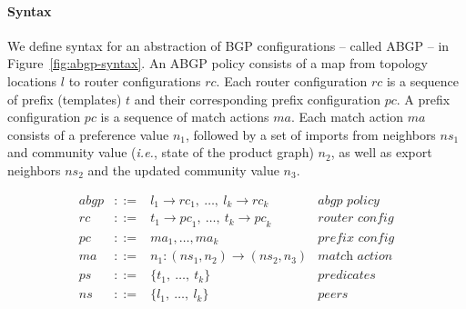 \documentclass[twocolumn, openany]{sig-alternate-10pt}
\newcommand{\IE}{\emph{i.e.}}
\newcommand{\para}[1]{\paragraph*{\textbf{#1}}}
\begin{document}
\para{Syntax}

We define syntax for an abstraction of BGP configurations -- called ABGP -- in Figure~\ref{fig:abgp-syntax}. An ABGP policy consists of a map from topology locations $l$ to router configurations $rc$. Each router configuration $rc$ is a sequence of prefix (templates) $t$ and their corresponding prefix configuration $pc$. A prefix configuration $pc$ is a sequence of match actions $ma$. Each match action $ma$ consists of a preference value $n_1$, followed by a set of imports from neighbors $ns_1$ and community value (\IE, state of the product graph) $n_2$, as well as export neighbors $ns_2$ and the updated community value $n_3$.

\vspace{2em}
\begin{figure}[h!]\small

  \hrulefill%
  \vspace{1em}

  \begin{minipage}[t]{.5\linewidth}
  \vspace*{-1\baselineskip}
  \[ \begin{array}{rclr}
     abgp &::=& l_1 \rightarrow {rc}_1, ~\dots,~ l_k \rightarrow {rc}_k & \textit{abgp policy} \\
     rc   &::=& t_1 \rightarrow {pc}_1, ~\dots,~ t_k \rightarrow {pc}_k & \textit{router config} \\
     pc   &::=& ma_1, \dots, ma_k & \textit{prefix config} \\
     ma   &::=& n_1 : ({ns}_1, n_2) \rightarrow ({ns}_2, n_3) & \textit{match action} \\
     ps   &::=& \{ t_1, ~\dots,~ t_k \} & \textit{predicates} \\
     ns   &::=& \{ l_1, ~\dots,~ l_k \} & \textit{peers} \\
  \end{array} \]%


\end{minipage}
\end{figure}
\end{document}
